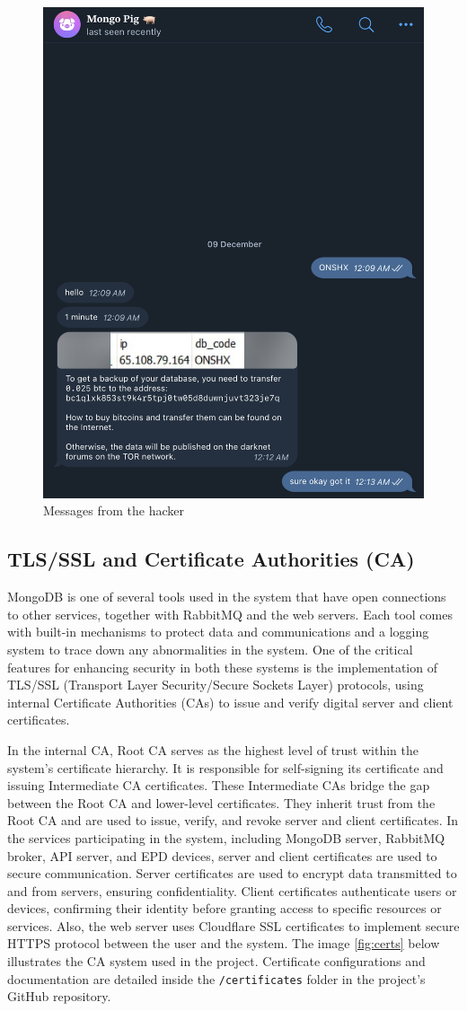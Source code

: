 \documentclass[../Main.tex]{subfiles}
\begin{document}
\begin{figure}[H]
    \centering
    \includegraphics[width=0.5\linewidth]{doc/imgs/mongo-pig.png}
    \caption{Messages from the hacker}
    \label{fig:mongo-pig}
\end{figure}
 
\subsection{TLS/SSL and Certificate Authorities (CA)}
MongoDB is one of several tools used in the system that have open connections to other services, together with RabbitMQ and the web servers. Each tool comes with built-in mechanisms to protect data and communications and a logging system to trace down any abnormalities in the system. One of the critical features for enhancing security in both these systems is the implementation of TLS/SSL (Transport Layer Security/Secure Sockets Layer) protocols, using internal Certificate Authorities (CAs) to issue and verify digital server and client certificates.

In the internal CA, Root CA serves as the highest level of trust within the system's certificate hierarchy. It is responsible for self-signing its certificate and issuing Intermediate CA certificates. These Intermediate CAs bridge the gap between the Root CA and lower-level certificates. They inherit trust from the Root CA and are used to issue, verify, and revoke server and client certificates. In the services participating in the system, including MongoDB server, RabbitMQ broker, API server, and \gls{EPD} devices, server and client certificates are used to secure communication. Server certificates are used to encrypt data transmitted to and from servers, ensuring confidentiality. Client certificates authenticate users or devices, confirming their identity before granting access to specific resources or services. Also, the web server uses Cloudflare SSL certificates to implement secure HTTPS protocol between the user and the system. The image \ref{fig:certs} below illustrates the CA system used in the project. Certificate configurations and documentation are detailed inside the \verb|/certificates| folder in the project's GitHub repository.
\end{document}
